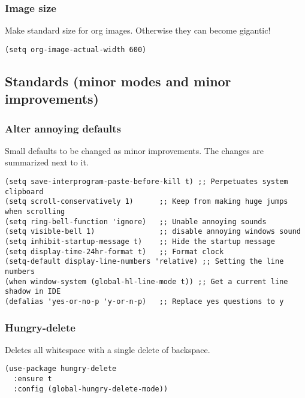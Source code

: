 \documentclass[11pt]{article}
\begin{document}
\subsubsection{Image size}
\label{sec:org8da8284}
Make standard size for org images. Otherwise they can become gigantic!
\begin{verbatim}
(setq org-image-actual-width 600)
\end{verbatim}
\subsection{Standards (minor modes and minor improvements)}
\label{sec:orgbd05a8f}
\subsubsection{Alter annoying defaults}
\label{sec:org67165af}
Small defaults to be changed as minor improvements. The changes are summarized next to it.
\begin{verbatim}
(setq save-interprogram-paste-before-kill t) ;; Perpetuates system clipboard
(setq scroll-conservatively 1)      ;; Keep from making huge jumps when scrolling
(setq ring-bell-function 'ignore)   ;; Unable annoying sounds
(setq visible-bell 1)               ;; disable annoying windows sound
(setq inhibit-startup-message t)    ;; Hide the startup message
(setq display-time-24hr-format t)   ;; Format clock
(setq-default display-line-numbers 'relative) ;; Setting the line numbers
(when window-system (global-hl-line-mode t)) ;; Get a current line shadow in IDE
(defalias 'yes-or-no-p 'y-or-n-p)   ;; Replace yes questions to y
\end{verbatim}
\subsubsection{Hungry-delete}
\label{sec:orgbe789cf}
Deletes all whitespace with a single delete of backspace.
\begin{verbatim}
(use-package hungry-delete
  :ensure t
  :config (global-hungry-delete-mode))
\end{verbatim}
\end{document}
